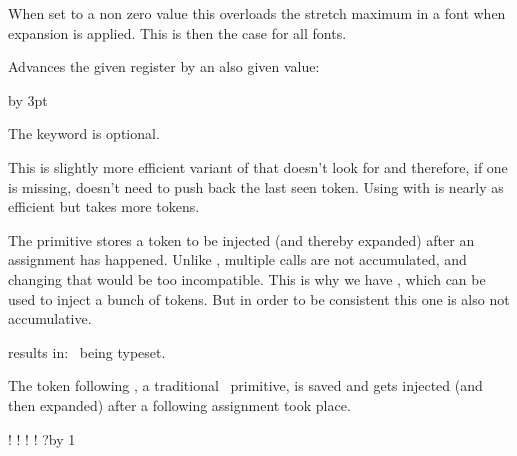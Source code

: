 \stopnewprimitive

\startnewprimitive[title={\prm {adjustspacingstretch}}]

When set to a non zero value this overloads the stretch maximum in a font when
expansion is applied. This is then the case for all fonts.

\stopnewprimitive

\startoldprimitive[title={\prm {advance}}]

Advances the given register by an also given value:

\starttyping
\advance\scratchdimen      10pt
\advance\scratchdimen      by 3pt
\advance\scratchcounterone \zerocount
\advance\scratchcounterone \scratchcountertwo
\stoptyping

The  keyword is optional.

\stopoldprimitive

\startnewprimitive[title={\prm {advanceby}}]

This is slightly more efficient variant of  that doesn't look for
 and therefore, if one is missing, doesn't need to push back the last
seen token. Using  with  is nearly as efficient but takes
more tokens.

\stopnewprimitive

\startnewprimitive[title={\prm {afterassigned}}]

The  primitive stores a token to be injected (and thereby
expanded) after an assignment has happened. Unlike , multiple
calls are not accumulated, and changing that would be too incompatible. This is
why we have , which can be used to inject a bunch of
tokens. But in order to be consistent this one is also not accumulative.

\startbuffer
{}%
%
\stopbuffer

\typebuffer

results in: \inlinebuffer\ being typeset.

\stopnewprimitive

\startoldprimitive[title={\prm {afterassignment}}]

The token following , a traditional \TEX\ primitive, is
saved and gets injected (and then expanded) after a following assignment took
place.

\startbuffer
\afterassignment !\def\MyMacro {}\quad
\afterassignment !\let\MyMacro ?\quad
\afterassignment !\quad
\afterassignment !%
\afterassignment ?\advance\scratchcounter by 1
\stopbuffer

